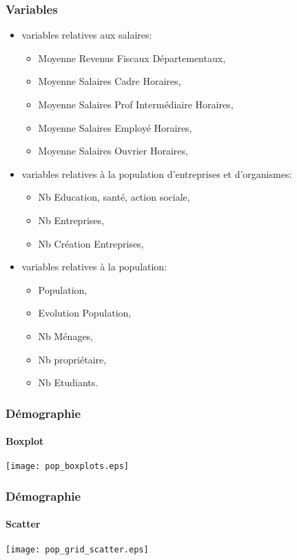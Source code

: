 \documentclass{beamer}
\begin{document}
\begin{frame}
	\frametitle{Variables}
	\begin{itemize}
	\item variables relatives aux salaires: 
		\begin{itemize}
		\item Moyenne Revenus Fiscaux Départementaux,
	    \item Moyenne Salaires Cadre Horaires,
	    \item Moyenne Salaires Prof Intermédiaire Horaires,
	    \item Moyenne Salaires Employé Horaires,
	    \item Moyenne Salaires Ouvrier Horaires,
		\end{itemize}
	\item variables relatives à la population d'entreprises et d'organismes:
		\begin{itemize}
		\item Nb Education, santé, action sociale,
		\item Nb Entreprises,
		\item Nb Création Entreprises,
		\end{itemize}
	\item variables relatives à la population:
		\begin{itemize}
		\item Population,
		\item Evolution Population,
		\item Nb Ménages,
		\item Nb propriétaire,
		\item Nb Etudiants.
		\end{itemize}
	\end{itemize}
\end{frame}


\begin{frame}
	\frametitle{Démographie}
	\framesubtitle{Boxplot}
	\begin{center}
	\texttt{[image: pop\_boxplots.eps]}
	\end{center}
\end{frame}


\begin{frame}
	\frametitle{Démographie}
	\framesubtitle{Scatter}
	\begin{center}
	\texttt{[image: pop\_grid\_scatter.eps]}
	\end{center}
\end{frame}
\end{document}
